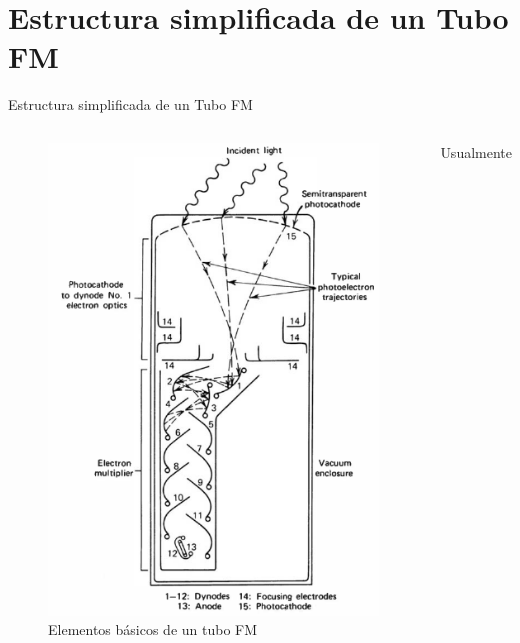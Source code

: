 \documentclass[a4paper,10pt]{beamer}
\begin{document}
\section{Estructura simplificada de un Tubo FM}
\begin{frame}[allowframebreaks]{Estructura simplificada de un Tubo FM}
 
 \begin{columns}[c]
  \column{1in}
  \begin{figure}
  \center
   \includegraphics[scale=0.25]{fig2}
   \caption{Elementos básicos de un tubo FM}
  \end{figure}

  \column{1in}
  \begin{justify}
   
   Usualmente 
   
  \end{justify}

 \end{columns} 
 
\end{frame}
\end{document}
